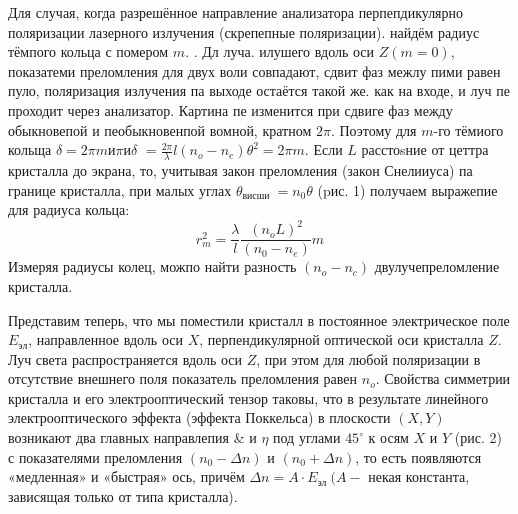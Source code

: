 \documentclass[a4paper, 12pt]{article}
\begin{document}
Для случая, когда разрешённое направление анализатора перпепдикулярно поляризации лазерного излучения (скрепепные поляризации). найдём радиус тёмпого кольца с помером $m$. . Дл луча. илушего вдоль оси $Z(m=0)$, показатеми преломления для двух воли совпадают, сдвит фаз межлу пими равен пуло, поляризация излучения па выходе остаётся такой же. как на входе, и луч пе проходит через анализатор. Картина пе изменится при сдвиге фаз между обыкновепой и пеобыкновенпой вомной, кратном $2 \pi$. Поэтому для $m$-го тёмиого кольща $\delta=2 \pi m и \pi и \delta$ $=\frac{2 \pi}{\lambda} l\left(n_o-n_e\right) \theta^2=2 \pi m$. Если $L$ расстоsние от цеттра кристалла до экрана, то, учитывая закон преломления (закон Снелииуса) па границе кристалла, при малых углах $\theta_{\text {висши }}=n_0 \theta$ (pис. 1) получаем выражепие для радиуса кольца:
\begin{equation}
r_m^2=\frac{\lambda}{l} \frac{\left(n_o L\right)^2}{\left(n_0-n_e\right)} m
\end{equation}
Измеряя радиусы колец, можпо найти разность $\left(n_o-n_c\right)$ двулучепреломление кристалла.

Представим теперь, что мы поместили кристалл в постоянное электрическое поле $E_{э л}$, направленное вдоль оси $X$, перпендикулярной оптической оси кристалла $Z$. Луч света распространяется вдоль оси $Z$, при этом для любой поляризации в отсутствие внешнего поля показатель преломления равен $n_o$. Свойства симметрии кристалла и его электрооптический тензор таковы, что в результате линейного электрооптического эффекта (эффекта Поккельса) в плоскости $(X, Y)$ возникают два главных направлепия \& и $\eta$ под углами $45^{\circ}$ к осям $X$ и $Y$ (рис. 2) с показателями преломления $\left(n_0-\Delta n\right)$ и $\left(n_0+\Delta n\right)$, то есть появляются «медленная» и «быстрая» ось, причём $\Delta n=A \cdot E_{\text {эл }}(A-$ некая константа, зависящая только от типа кристалла).
\end{document}
